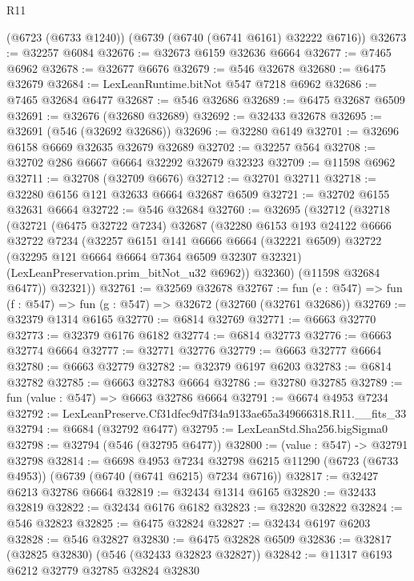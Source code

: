 \begin{lexlean}{R11}
\begin{coremodule}
    (@6723 (@6733 @1240))
    (@6739 (@6740 (@6741 @6161) @32222 @6716))
@32673 := @32257 @6084
@32676 := @32673 @6159 @32636 @6664
@32677 := @7465 @6962
@32678 := @32677 @6676
@32679 := @546 @32678
@32680 := @6475 @32679
@32684 := LexLeanRuntime.bitNot @547 @7218 @6962
@32686 := @7465 @32684 @6477
@32687 := @546 @32686
@32689 := @6475 @32687 @6509
@32691 := @32676 (@32680 @32689)
@32692 := @32433 @32678
@32695 := @32691 (@546 (@32692 @32686))
@32696 := @32280 @6149
@32701 := @32696 @6158 @6669 @32635 @32679 @32689
@32702 := @32257 @564
@32708 := @32702 @286 @6667 @6664 @32292 @32679 @32323
@32709 := @11598 @6962
@32711 := @32708 (@32709 @6676)
@32712 := @32701 @32711
@32718 := @32280 @6156 @121 @32633 @6664 @32687 @6509
@32721 := @32702 @6155 @32631 @6664
@32722 := @546 @32684
@32760 := @32695
    (@32712
      (@32718
        (@32721
          (@6475 @32722 @7234)
          @32687
          (@32280
            @6153
            @193
            @24122
            @6666
            @32722
            @7234
            (@32257
              @6151
              @141
              @6666
              @6664
              (@32221 @6509)
              @32722
              (@32295 @121 @6664 @6664 @7364 @6509 @32307 @32321)
              (LexLeanPreservation.prim_bitNot_u32 @6962))
            @32360)
          (@11598 @32684 @6477))
        @32321))
@32761 := @32569 @32678
@32767 := fun (e : @547) => fun (f : @547) => fun (g : @547) => @32672 (@32760 (@32761 @32686))
@32769 := @32379 @1314 @6165
@32770 := @6814 @32769
@32771 := @6663 @32770
@32773 := @32379 @6176 @6182
@32774 := @6814 @32773
@32776 := @6663 @32774 @6664
@32777 := @32771 @32776
@32779 := @6663 @32777 @6664
@32780 := @6663 @32779
@32782 := @32379 @6197 @6203
@32783 := @6814 @32782
@32785 := @6663 @32783 @6664
@32786 := @32780 @32785
@32789 := fun (value : @547) => @6663 @32786 @6664
@32791 := @6674 @4953 @7234
@32792 := LexLeanPreserve.Cf31dfec9d7f34a9133ae65a349666318.R11.__fits_33
@32794 := @6684 (@32792 @6477)
@32795 := LexLeanStd.Sha256.bigSigma0
@32798 := @32794 (@546 (@32795 @6477))
@32800 := (value : @547) -> @32791 @32798
@32814 := @6698
    @4953
    @7234
    @32798
    @6215
    @11290
    (@6723 (@6733 @4953))
    (@6739 (@6740 (@6741 @6215) @7234 @6716))
@32817 := @32427 @6213 @32786 @6664
@32819 := @32434 @1314 @6165
@32820 := @32433 @32819
@32822 := @32434 @6176 @6182
@32823 := @32820 @32822
@32824 := @546 @32823
@32825 := @6475 @32824
@32827 := @32434 @6197 @6203
@32828 := @546 @32827
@32830 := @6475 @32828 @6509
@32836 := @32817 (@32825 @32830) (@546 (@32433 @32823 @32827))
@32842 := @11317 @6193 @6212 @32779 @32785 @32824 @32830

\end{coremodule}
\end{lexlean}
